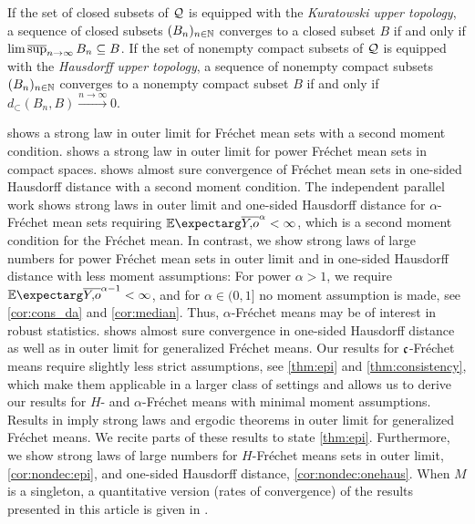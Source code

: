 If the set of closed subsets of $\mathcal{Q}$ is equipped with the \textit{Kuratowski upper topology}, a sequence of closed subsets $(B_n)_{n\in\mathbb{N}}$ converges to a closed subset $B$ if and only if $\operatorname*{lim\, \overline{sup}}_{n\to\infty} B_n \subseteq B$. 
If the set of nonempty compact subsets of $\mathcal{Q}$ is equipped with the \textit{Hausdorff upper topology}, a sequence of nonempty compact subsets $(B_n)_{n\in\mathbb{N}}$ converges to a nonempty compact subset $B$ if and only if $d_{\subset}(B_n, B)\xrightarrow{n\to\infty} 0$. 

\cite{ziezold77} shows a strong law in outer limit for Fréchet mean sets with a second moment condition.
\cite{sverdrup81} shows a strong law in outer limit for power Fréchet mean sets in compact spaces.
\cite{bhattacharya03} shows almost sure convergence of Fréchet mean sets in one-sided Hausdorff distance with a second moment condition.
The independent parallel work \cite{evans20} shows strong laws in outer limit and one-sided Hausdorff distance for $\alpha$-Fréchet mean sets requiring $\Ex{\ol Yo^{\alpha}} < \infty$, which is a second moment condition for the Fréchet mean.
In contrast, we show strong laws of large numbers for power Fréchet mean sets in outer limit and in one-sided Hausdorff distance with less moment assumptions: For power $\alpha>1$, we require $\Ex{\ol Yo^{\alpha-1}} < \infty$, and for $\alpha\in (0,1]$ no moment assumption is made, see \autoref{cor:cons_da} and \autoref{cor:median}. Thus, $\alpha$-Fréchet means may be of interest in robust statistics.
\cite{huckemann11} shows almost sure convergence in one-sided Hausdorff distance as well as in outer limit for generalized Fréchet means. Our results for $\mathfrak{c}$-Fréchet means require slightly less strict assumptions, see \autoref{thm:epi} and \autoref{thm:consistency}, which make them applicable in a larger class of settings and allows us to derive our results for $H$- and $\alpha$-Fréchet means with minimal moment assumptions.
Results in \cite{artstein95, korf01, choirat03} imply strong laws and ergodic theorems in outer limit for generalized Fréchet means. We recite parts of these results to state \autoref{thm:epi}.
Furthermore, we show strong laws of large numbers for $H$-Fréchet means sets in outer limit, \autoref{cor:nondec:epi}, and one-sided Hausdorff distance, \autoref{cor:nondec:onehaus}.
When $M$ is a singleton, a quantitative version (rates of convergence) of the results presented in this article is given in \cite{schoetz19}.

